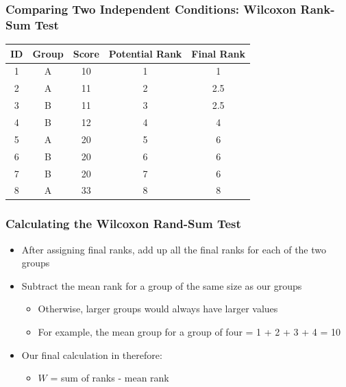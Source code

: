 \documentclass[12pt, block=fill]{beamer}
\begin{document}
\begin{frame}
  \frametitle{Comparing Two Independent Conditions: Wilcoxon Rank-Sum Test}

  \begin{center}
    \begin{tabular}{c|cccc}
      ID & Group & Score & Potential Rank & Final Rank \\ \hline
      1  & A     & 10    & 1              & 1   \\ 
      2  & A     & 11    & 2              & 2.5 \\ 
      3  & B     & 11    & 3              & 2.5 \\ 
      4  & B     & 12    & 4              & 4   \\ 
      5  & A     & 20    & 5              & 6   \\ 
      6  & B     & 20    & 6              & 6   \\ 
      7  & B     & 20    & 7              & 6   \\ 
      8  & A     & 33    & 8              & 8   \\
    \end{tabular}
  \end{center}

\end{frame}


\begin{frame}
  \frametitle{Calculating the Wilcoxon Rand-Sum Test}
  
  \begin{itemize}
    \item After assigning final ranks, add up all the final ranks for each of the two groups
    \item Subtract the mean rank for a group of the same size as our groups
    \begin{itemize}
      \item Otherwise, larger groups would always have larger values
      \item For example, the mean group for a group of four = 1 + 2 + 3 + 4 = 10
    \end{itemize}
    \item Our final calculation in therefore:
    \begin{itemize}
      \item $W$ = sum of ranks - mean rank
    \end{itemize}
  \end{itemize}
    
\end{frame}
\end{document}
